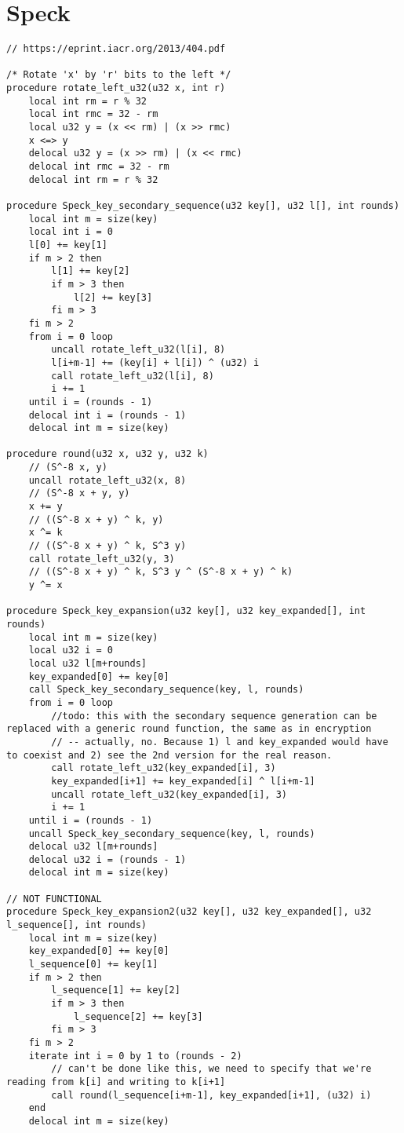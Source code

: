 \documentclass[a4paper,10pt,openright]{memoir}
\begin{document}
\section{Speck}
\begin{lstlisting}[language=Janus,breaklines=true]
// https://eprint.iacr.org/2013/404.pdf

/* Rotate 'x' by 'r' bits to the left */
procedure rotate_left_u32(u32 x, int r)
    local int rm = r % 32
    local int rmc = 32 - rm
    local u32 y = (x << rm) | (x >> rmc)
    x <=> y
    delocal u32 y = (x >> rm) | (x << rmc)
    delocal int rmc = 32 - rm
    delocal int rm = r % 32

procedure Speck_key_secondary_sequence(u32 key[], u32 l[], int rounds)
    local int m = size(key)
    local int i = 0
    l[0] += key[1]
    if m > 2 then
        l[1] += key[2]
        if m > 3 then
            l[2] += key[3]
        fi m > 3
    fi m > 2
    from i = 0 loop
        uncall rotate_left_u32(l[i], 8)
        l[i+m-1] += (key[i] + l[i]) ^ (u32) i
        call rotate_left_u32(l[i], 8)
        i += 1
    until i = (rounds - 1)
    delocal int i = (rounds - 1)
    delocal int m = size(key)

procedure round(u32 x, u32 y, u32 k)
    // (S^-8 x, y)
    uncall rotate_left_u32(x, 8)
    // (S^-8 x + y, y)
    x += y
    // ((S^-8 x + y) ^ k, y)
    x ^= k
    // ((S^-8 x + y) ^ k, S^3 y)
    call rotate_left_u32(y, 3)
    // ((S^-8 x + y) ^ k, S^3 y ^ (S^-8 x + y) ^ k)
    y ^= x

procedure Speck_key_expansion(u32 key[], u32 key_expanded[], int rounds)
    local int m = size(key)
    local u32 i = 0
    local u32 l[m+rounds]
    key_expanded[0] += key[0]
    call Speck_key_secondary_sequence(key, l, rounds)
    from i = 0 loop
        //todo: this with the secondary sequence generation can be replaced with a generic round function, the same as in encryption
        // -- actually, no. Because 1) l and key_expanded would have to coexist and 2) see the 2nd version for the real reason.
        call rotate_left_u32(key_expanded[i], 3)
        key_expanded[i+1] += key_expanded[i] ^ l[i+m-1]
        uncall rotate_left_u32(key_expanded[i], 3)
        i += 1
    until i = (rounds - 1)
    uncall Speck_key_secondary_sequence(key, l, rounds)
    delocal u32 l[m+rounds]
    delocal u32 i = (rounds - 1)
    delocal int m = size(key)

// NOT FUNCTIONAL
procedure Speck_key_expansion2(u32 key[], u32 key_expanded[], u32 l_sequence[], int rounds)
    local int m = size(key)
    key_expanded[0] += key[0]
    l_sequence[0] += key[1]
    if m > 2 then
        l_sequence[1] += key[2]
        if m > 3 then
            l_sequence[2] += key[3]
        fi m > 3
    fi m > 2
    iterate int i = 0 by 1 to (rounds - 2)
        // can't be done like this, we need to specify that we're reading from k[i] and writing to k[i+1]
        call round(l_sequence[i+m-1], key_expanded[i+1], (u32) i)
    end
    delocal int m = size(key)
    


\end{lstlisting}
\end{document}
